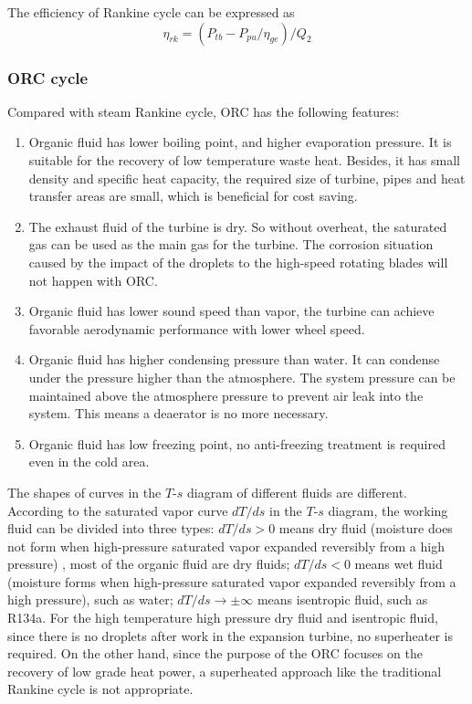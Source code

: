 The efficiency of Rankine cycle can be expressed as
\begin{equation}
	\eta_{rk}=(P_{tb}-P_{pu}/\eta_{ge})/Q_{2}
\end{equation}

  \subsubsection{ORC cycle}
  
  Compared with steam Rankine cycle, ORC has the following features:
  \begin{enumerate}
  \item Organic fluid has lower boiling point, and higher evaporation pressure. It is suitable for the recovery of low temperature waste heat. Besides, it has small density and specific heat capacity, the required size of turbine, pipes and heat transfer areas are small, which is beneficial for cost saving.
  \item The exhaust fluid of the turbine is dry. So without overheat, the saturated gas can be used as the main gas for the turbine. The corrosion situation caused by the impact of the droplets to the high-speed rotating blades will not happen with ORC.
  \item Organic fluid has lower sound speed than vapor, the turbine can achieve favorable aerodynamic performance with lower wheel speed. 
  \item Organic fluid has higher condensing pressure than water. It can condense under the pressure higher than the atmosphere. The system pressure can be maintained above the atmosphere pressure to prevent air leak into the system. This means a deaerator is no more necessary.
  \item Organic fluid has low freezing point, no anti-freezing treatment is required even in the cold area.
\end{enumerate}

The shapes of curves in the $T$-$s$ diagram of different fluids are different. According to the saturated vapor curve $dT/ds$ in the $T$-$s$ diagram, the working fluid can be divided into three types: $dT / ds > 0$ means dry fluid (moisture does not form when high-pressure saturated vapor expanded reversibly from a high pressure) , most of the organic fluid are dry fluids; $dT / ds < 0$ means wet fluid (moisture forms when high-pressure saturated vapor expanded reversibly from a high pressure), such as water; $dT/ds \rightarrow \pm\infty$ means isentropic fluid, such as R134a. For the high temperature high pressure dry fluid and isentropic fluid, since there is no droplets after work in the expansion turbine, no superheater is required. On the other hand, since the purpose of the ORC focuses on the recovery of low grade heat power, a superheated approach like the traditional Rankine cycle is not appropriate. 

